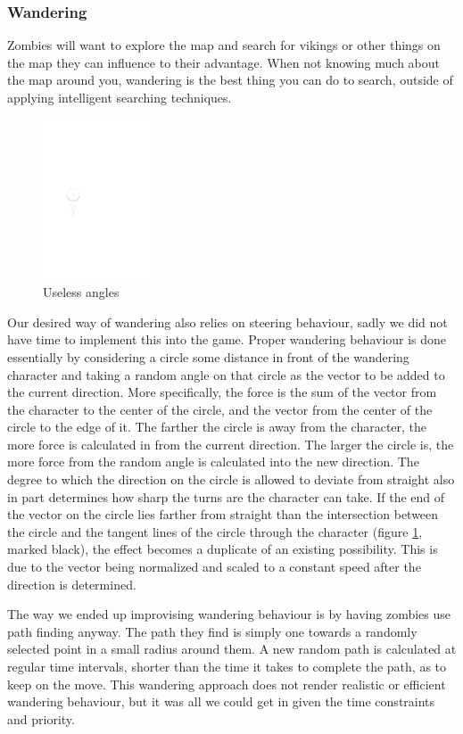 \subsubsection{Wandering}
Zombies will want to explore the map and search for vikings or other things on the map they can influence to their advantage. When not knowing much about the map around you, wandering is the best thing you can do to search, outside of applying intelligent searching techniques. 
\begin{figure}
\includegraphics[width=0.30\textwidth]{images/useless_angle.pdf}
\caption{Useless angles}
\label{fig:tangents}
\end{figure}

Our desired way of wandering also relies on steering behaviour, sadly we did not have time to implement this into the game. Proper wandering behaviour is done essentially by considering a circle some distance in front of the wandering character and taking a random angle on that circle as the vector to be added to the current direction. More specifically, the force is the sum of the vector from the character to the center of the circle, and the vector from the center of the circle to the edge of it. The farther the circle is away from the character, the more force is calculated in from the current direction. The larger the circle is, the more force from the random angle is calculated into the new direction. The degree to which the direction on the circle is allowed to deviate from straight also in part determines how sharp the turns are the character can take. If the end of the vector on the circle lies farther from straight than the intersection between the circle and the tangent lines of the circle through 
the character (figure \ref{fig:tangents}, marked black), the effect becomes a duplicate of an existing possibility. This is due to the vector being normalized and scaled to a constant speed after the direction is determined.

The way we ended up improvising wandering behaviour is by having zombies use path finding anyway. The path they find is simply one towards a randomly selected point in a small radius around them. A new random path is calculated at regular time intervals, shorter than the time it takes to complete the path, as to keep on the move. This wandering approach does not render realistic or efficient wandering behaviour, but it was all we could get in given the time constraints and priority.
